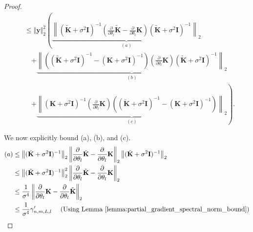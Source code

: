 \begin{proof}
\begin{align*}
    &\leq\Vert \textbf{y}\Vert_2^2  \left(\underbrace{\left\| (\tilde{\mathbf{K}} + \sigma^2 \mathbf{I})^{-1} \left(\frac{\partial}{\partial \theta_l} \tilde{\mathbf{K}} - \frac{\partial}{\partial \theta_l} \mathbf{K}\right) (\tilde{\mathbf{K}} + \sigma^2 \mathbf{I})^{-1} \right\|_{2}}_{(a)} \right.\\
    &\quad \left.+ \underbrace{\left\| \left((\tilde{\mathbf{K}} + \sigma^2 \mathbf{I})^{-1} - (\mathbf{K} + \sigma^2 \mathbf{I})^{-1}\right)\left(\frac{\partial}{\partial \theta_l} \mathbf{K}\right) (\tilde{\mathbf{K}} + \sigma^2 \mathbf{I})^{-1} \right\|_{2}}_{(b)} \right.\\
    &\quad \left.+ \underbrace{\left\|(\mathbf{K} + \sigma^2 \mathbf{I})^{-1}\left(\frac{\partial}{\partial \theta_l} \mathbf{K}\right)\left((\tilde{\mathbf{K}} + \sigma^2 \mathbf{I})^{-1} - (\mathbf{K} + \sigma^2 \mathbf{I})^{-1}\right) \right\|_{2}}_{(c)}\right).
\end{align*}



We now explicitly bound (a), (b), and (c).
\begin{align*}
(a) &\leq \left\| (\tilde{\mathbf{K}} + \sigma^2 \mathbf{I})^{-1} \right\|_2 \left\| \frac{\partial}{\partial \theta_l} \tilde{\mathbf{K}} - \frac{\partial}{\partial \theta_l} \mathbf{K} \right\|_2 \left\| (\tilde{\mathbf{K}} + \sigma^2 \mathbf{I})^{-1} \right\|_2\\
&\leq \left\| (\tilde{\mathbf{K}} + \sigma^2 \mathbf{I})^{-1} \right\|_2^2 \left\| \frac{\partial}{\partial \theta_l} \tilde{\mathbf{K}} - \frac{\partial}{\partial \theta_l} \mathbf{K} \right\|_2 \\
&\leq \frac{1}{\sigma^4} \left\| \frac{\partial}{\partial \theta_l} \mathbf{K} - \frac{\partial}{\partial \theta_l} \tilde{\mathbf{K}} \right\|_2\\
&\leq  \frac{1}{\sigma^4} \gamma'_{n,m,L,l} \quad \text{ (Using Lemma \ref{lemma:partial_gradient_spectral_norm_bound})}
\end{align*}


\end{proof}
